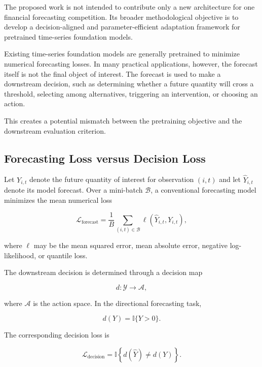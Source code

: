 \documentclass[11pt]{article}
\newcommand{\ind}{\mathbb{I}}
\begin{document}
\iffalse
The proposed work is not intended to contribute only a new architecture for
one financial forecasting competition. Its broader methodological objective is
to develop a decision-aligned and parameter-efficient adaptation framework for
pretrained time-series foundation models.

Existing time-series foundation models are generally pretrained to minimize
numerical forecasting losses. In many practical applications, however, the
forecast itself is not the final object of interest. The forecast is used to
make a downstream decision, such as determining whether a future quantity will
cross a threshold, selecting among alternatives, triggering an intervention,
or choosing an action.

This creates a potential mismatch between the pretraining objective and the
downstream evaluation criterion.

\subsection{Forecasting Loss versus Decision Loss}

Let $Y_{i,t}$ denote the future quantity of interest for observation $(i,t)$
and let $\widehat Y_{i,t}$ denote its model forecast. Over a mini-batch
$\mathcal B$, a conventional forecasting model minimizes the mean numerical
loss

\begin{equation}
\mathcal{L}_{\mathrm{forecast}}
=
\frac{1}{B}
\sum_{(i,t)\in\mathcal B}
\ell\left(\widehat Y_{i,t},Y_{i,t}\right),
\end{equation}

where $\ell$ may be the mean squared error, mean absolute error, negative
log-likelihood, or quantile loss.

The downstream decision is determined through a decision map

\begin{equation}
d:
\mathcal{Y}
\rightarrow
\mathcal{A},
\end{equation}

where $\mathcal{A}$ is the action space. In the directional forecasting task,

\begin{equation}
d(Y)
=
\ind\{Y>0\}.
\end{equation}

The corresponding decision loss is

\begin{equation}
\mathcal{L}_{\mathrm{decision}}
=
\ind
\left\{
d(\widehat Y)
\neq
d(Y)
\right\}.
\end{equation}
\end{document}
